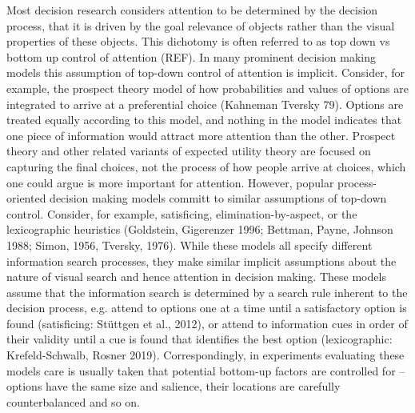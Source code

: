 \documentclass{article}
\begin{document}
Most decision research considers attention to be determined by the decision process, that it is driven by the goal relevance of objects rather than the visual properties of these objects. This dichotomy is often referred to as top down vs bottom up control of attention (REF).  In many prominent decision making models this assumption of top-down control of attention is implicit. Consider, for example, the prospect theory model of how probabilities and values of options are integrated  to arrive at a preferential choice (Kahneman Tversky 79). Options are treated equally according to this model, and nothing in the model indicates that one piece of information would attract more attention than the other. Prospect theory and other related variants of expected utility theory are focused on capturing the final choices, not the process of how people arrive at choices, which one could argue is more important for attention. However, popular process-oriented decision making models committ to similar assumptions of top-down control. Consider, for example, satisficing, elimination-by-aspect, or the lexicographic heuristics (Goldstein, Gigerenzer 1996; Bettman, Payne, Johnson 1988; Simon, 1956, Tversky, 1976). While these models all specify different information search processes, they make similar implicit assumptions about the nature of visual search and hence attention in decision making. These  models assume that the information search is determined by a search rule inherent to the decision process, e.g. attend to options one at a time until a satisfactory option is found (satisficing: Stüttgen et al., 2012), or attend to information cues in order of their validity until a cue is found that identifies the best option (lexicographic: Krefeld-Schwalb, Rosner 2019). Correspondingly, in experiments evaluating these models care is usually taken that potential bottom-up factors are controlled for – options have the same size and salience, their locations are carefully counterbalanced and so on. 
\end{document}
